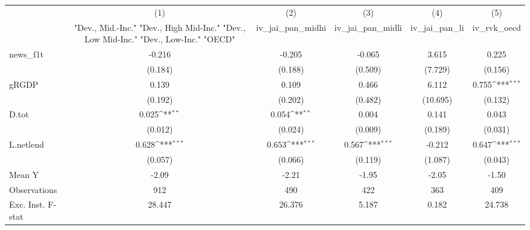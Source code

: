 {
\def\sym#1{\ifmmode^{#1}\else\(^{#1}\)\fi}
\begin{tabular}{l*{5}{c}}
\toprule
            &\multicolumn{1}{c}{(1)}&\multicolumn{1}{c}{(2)}&\multicolumn{1}{c}{(3)}&\multicolumn{1}{c}{(4)}&\multicolumn{1}{c}{(5)}\\
            &\multicolumn{1}{c}{ "Dev., Mid.-Inc." "Dev., High Mid-Inc." "Dev., Low Mid-Inc." "Dev., Low-Inc." "OECD" }&\multicolumn{1}{c}{iv\_jai\_pan\_midhi}&\multicolumn{1}{c}{iv\_jai\_pan\_midli}&\multicolumn{1}{c}{iv\_jai\_pan\_li}&\multicolumn{1}{c}{iv\_rvk\_oecd}\\
\midrule
news\_f1t    &      -0.216         &      -0.205         &      -0.065         &       3.615         &       0.225         \\
            &     (0.184)         &     (0.188)         &     (0.509)         &     (7.729)         &     (0.156)         \\
\addlinespace
gRGDP       &       0.139         &       0.109         &       0.466         &       6.112         &       0.755\sym{***}\\
            &     (0.192)         &     (0.202)         &     (0.482)         &    (10.695)         &     (0.132)         \\
\addlinespace
D.tot       &       0.025\sym{**} &       0.054\sym{**} &       0.004         &       0.141         &       0.043         \\
            &     (0.012)         &     (0.024)         &     (0.009)         &     (0.189)         &     (0.031)         \\
\addlinespace
L.netlend   &       0.628\sym{***}&       0.653\sym{***}&       0.567\sym{***}&      -0.212         &       0.647\sym{***}\\
            &     (0.057)         &     (0.066)         &     (0.119)         &     (1.087)         &     (0.043)         \\
\midrule
Mean Y      &       -2.09         &       -2.21         &       -1.95         &       -2.05         &       -1.50         \\
Observations&         912         &         490         &         422         &         363         &         409         \\
Exc. Inst. F-stat&      28.447         &      26.376         &       5.187         &       0.182         &      24.738         \\
\bottomrule
\end{tabular}
}
